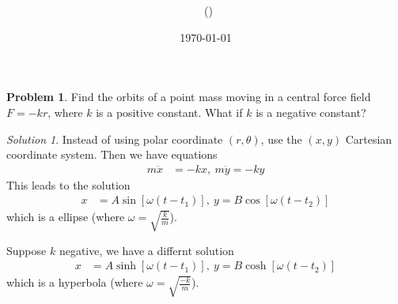 \documentclass[twoside,11pt]{article}
\title{{\lms \Code \ \Ass}}
\author{\lms \name \ (\href{mailto:\mail}{\mail})}
\date{\sffamily \today}
\makeatletter
\newcommand{\lms}{\fontfamily{lmss}\selectfont} %
\theoremstyle{definition}
\newtheorem{problem}{\lms Problem}
\theoremstyle{remark}
\newtheorem*{remark}{\lms Remark}
\newtheorem*{solution}{\lms Solution}
\renewcommand{\maketitle}{\bgroup\setlength{\parindent}{0pt}
\begin{flushleft}
  \textbf{\Large\@title}

  \@author
\end{flushleft}\egroup
}
\makeatother
\begin{document}
\maketitle
\thispagestyle{title}


\begin{problem}
Find the orbits of a point mass moving in a central force field $F=-kr$,
where $k$ is a positive constant.
What if $k$ is a negative constant?
\end{problem}
\begin{solution}
Instead of using polar coordinate $(r, \theta)$, use the $(x, y)$ Cartesian coordinate system.
Then we have equations
\begin{align*}
    m\ddot x &= -kx,~ m\ddot y = -ky
\end{align*}
This leads to the solution
\begin{align*}
    x &= A\sin[\omega(t - t_1)],~ y = B\cos[\omega(t-t_2)]
\end{align*}
which is a ellipse (where $\omega = \sqrt{\frac{k}{m}}$).

Suppose $k$ negative, we have a differnt solution
\begin{align*}
    x &= A\sinh[\omega(t - t_1)],~ y = B\cosh[\omega(t-t_2)]
\end{align*}
which is a hyperbola (where $\omega = \sqrt{\frac{-k}{m}}$).

\end{solution}
\end{document}
